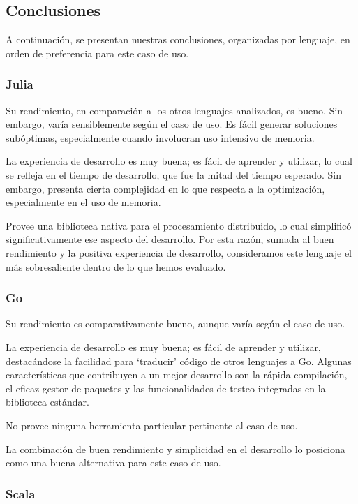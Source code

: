 \documentclass[11pt]{article}
\let\Oldsubsection\subsection
\renewcommand{\subsection}{\FloatBarrier\Oldsubsection}
\let\Oldsubsubsection\subsubsection
\renewcommand{\subsubsection}{\FloatBarrier\Oldsubsubsection}
\begin{document}
\subsection{Conclusiones}

A continuación, se presentan nuestras conclusiones, organizadas por lenguaje, en orden de preferencia para este caso de uso.

\subsubsection{Julia}

Su rendimiento, en comparación a los otros lenguajes analizados, es bueno. Sin embargo, varía sensiblemente según el caso de uso. Es fácil generar soluciones subóptimas, especialmente cuando involucran uso intensivo de memoria.

La experiencia de desarrollo es muy buena; es fácil de aprender y utilizar, lo cual se refleja en el tiempo de desarrollo, que fue la mitad del tiempo esperado. Sin embargo, presenta cierta complejidad en lo que respecta a la optimización, especialmente en el uso de memoria.

Provee una biblioteca nativa para el procesamiento distribuido, lo cual simplificó significativamente ese aspecto del desarrollo. Por esta razón, sumada al buen rendimiento y la positiva experiencia de desarrollo, consideramos este lenguaje el más sobresaliente dentro de lo que hemos evaluado.

\subsubsection{Go}

Su rendimiento es comparativamente bueno, aunque varía según el caso de uso.

La experiencia de desarrollo es muy buena; es fácil de aprender y utilizar, destacándose la facilidad para `traducir' código de otros lenguajes a Go. Algunas características que contribuyen a un mejor desarrollo son la rápida compilación, el eficaz gestor de paquetes y las funcionalidades de testeo integradas en la biblioteca estándar.

No provee ninguna herramienta particular pertinente al caso de uso.

La combinación de buen rendimiento y simplicidad en el desarrollo lo posiciona como una buena alternativa para este caso de uso.

\subsubsection{Scala}
\end{document}
